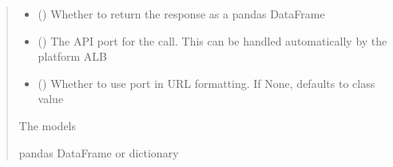 \documentclass[letterpaper,10pt,english]{sphinxmanual}
\begin{document}
\begin{fulllineitems}
\begin{fulllineitems}
\begin{sphinxVerbatim}[commandchars=\\\{\}]
 
  
\end{sphinxVerbatim}
\begin{quote}\begin{description}
\begin{itemize}
\item {} 
\sphinxAtStartPar
{} (\sphinxstyleliteralemphasis{\sphinxupquote{ (}}\sphinxstyleliteralemphasis{\sphinxupquote{)}}) \textendash{} Whether to return the response as a pandas DataFrame

\item {} 
\sphinxAtStartPar
{} () \textendash{} The API port for the call. This can be handled automatically by the platform ALB

\item {} 
\sphinxAtStartPar
{} (\sphinxstyleliteralemphasis{\sphinxupquote{ (}}\sphinxstyleliteralemphasis{\sphinxupquote{)}}) \textendash{} Whether to use port in URL formatting. If None, defaults to class value

\end{itemize}

\sphinxAtStartPar
{} \textendash{} The models

\sphinxAtStartPar
pandas DataFrame or dictionary

\end{description}\end{quote}

\end{fulllineitems}


\end{fulllineitems}
\end{document}
